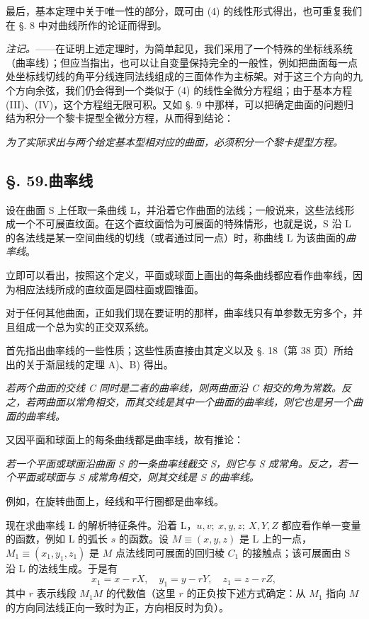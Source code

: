 最后，基本定理中关于唯一性的部分，既可由 (4) 的线性形式得出，也可重复我们在 \S. 8 中对曲线所作的论证而得到。

\emph{注记。}——在证明上述定理时，为简单起见，我们采用了一个特殊的坐标线系统（曲率线）；但应当指出，也可以让自变量保持完全的一般性，例如把曲面每一点处坐标线切线的角平分线连同法线组成的三面体作为主标架。对于这三个方向的九个方向余弦，我们仍会得到一个类似于 (4) 的线性全微分方程组；由于基本方程 (III)、(IV)，这个方程组无限可积。又如 \S. 9 中那样，可以把确定曲面的问题归结为积分一个黎卡提型全微分方程，从而得到结论：

\emph{为了实际求出与两个给定基本型相对应的曲面，必须积分一个黎卡提型方程。}

\subsection*{\S. 59.\quad 曲率线}

设在曲面 S 上任取一条曲线 L，并沿着它作曲面的法线；一般说来，这些法线形成一个不可展直纹面。在这个直纹面恰为可展面的特殊情形，也就是说，S 沿 L 的各法线是某一空间曲线的切线（或者通过同一点）时，称曲线 L 为该曲面的\emph{曲率线}。

立即可以看出，按照这个定义，平面或球面上画出的每条曲线都应看作曲率线，因为相应法线所成的直纹面是圆柱面或圆锥面。

对于任何其他曲面，正如我们现在要证明的那样，曲率线只有单参数无穷多个，并且组成一个总为实的正交双系统。

首先指出曲率线的一些性质；这些性质直接由其定义以及 \S. 18（第 38 页）所给出的关于渐屈线的定理 A)、B) 得出。

\emph{若两个曲面的交线 C 同时是二者的曲率线，则两曲面沿 C 相交的角为常数。反之，若两曲面以常角相交，而其交线是其中一个曲面的曲率线，则它也是另一个曲面的曲率线。}

又因平面和球面上的每条曲线都是曲率线，故有推论：

\emph{若一个平面或球面沿曲面 S 的一条曲率线截交 S，则它与 S 成常角。反之，若一个平面或球面与 S 成常角相交，则其交线是 S 的曲率线。}

例如，在旋转曲面上，经线和平行圈都是曲率线。

现在求曲率线 L 的解析特征条件。沿着 L，\(u,v;\ x,y,z;\ X,Y,Z\) 都应看作单一变量的函数，例如 L 的弧长 \(s\) 的函数。设 \(M\equiv(x,y,z)\) 是 L 上的一点，\(M_1\equiv(x_1,y_1,z_1)\) 是 \(M\) 点法线同可展面的回归棱 \(C_1\) 的接触点；该可展面由 S 沿 L 的法线生成。于是有
\begin{equation}\tag{5}
 x_1=x-rX,\quad y_1=y-rY,\quad z_1=z-rZ,
\end{equation}
其中 \(r\) 表示线段 \(M_1M\) 的代数值（这里 \(r\) 的正负按下述方式确定：从 \(M_1\) 指向 \(M\) 的方向同法线正向一致时为正，方向相反时为负）。

